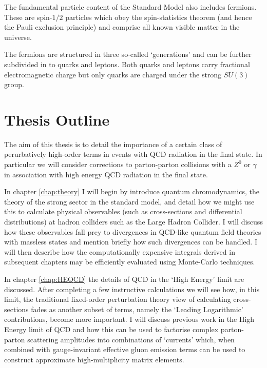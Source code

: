 	The fundamental particle content of the Standard Model also includes fermions. These are spin-$1/2$ particles which obey the spin-statistics theorem (and
	hence the Pauli exclusion principle) and comprise all known visible matter in the universe.

	The fermions are structured in three so-called `generations' and can be further subdivided in to quarks and leptons.  Both quarks and leptons
	carry fractional electromagnetic charge but only quarks are charged under the strong $SU(3)$ group.

\section{Thesis Outline}
\label{sec:outline}

	The aim of this thesis is to detail the importance of a certain class of perurbatively high-order terms in events with QCD radiation in the final state.  In particular
	we will consider corrections to parton-parton collisions with a $Z^0$ or $\gamma$ in association with high energy QCD radiation in the final state.

	In chapter \ref{chap:theory} I will begin by introduce quantum chromodynamics, the theory of the strong sector in the standard model, and detail how we might use this
	to calculate physical observables (such as cross-sections and differential distributions) at hadron colliders such as the Large Hadron Collider.  I will discuss how
	these observables fall prey to divergences in QCD-like quantum field theories with massless states and mention briefly how such divergences can be handled.  I will then
	describe how the computationally expensive integrals derived in subsequent chapters may be efficiently evaluated using Monte-Carlo techniques.

	In chapter \ref{chap:HEQCD} the details of QCD in the `High Energy' limit are discussed.  After completing a few instructive calculations we will see how,
	in this limit, the traditional fixed-order perturbation theory view of calculating cross-sections fades as another subset of terms, namely the `Leading
	Logarithmic' contributions, become more important.  I will discuss previous work in the High Energy limit of QCD and how this can be used to factorise
	complex parton-parton scattering amplitudes into combinations of `currents' which, when combined with gauge-invariant effective gluon emission terms can be used to
	construct approximate high-multiplicity matrix elements.

